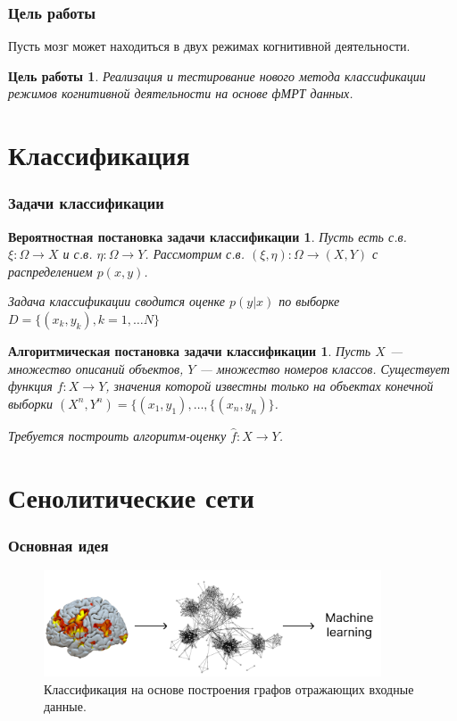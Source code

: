 \documentclass{beamer}
\newtheorem{target_}{Цель работы}
\newtheorem{prob_}{Вероятностная постановка задачи классификации}
\newtheorem{algo_}{Алгоритмическая постановка задачи классификации}
\begin{document}
	\begin{frame} 
		\frametitle{Цель работы}
		Пусть мозг может находиться в двух режимах когнитивной деятельности. 
		
		\begin{target_}
			Реализация и тестирование нового метода классификации режимов когнитивной деятельности на основе фМРТ данных.
		\end{target_}			
	\end{frame}

	\section{Классификация}
	\begin{frame} 
		\frametitle{Задачи классификации}
		\begin{prob_}
			Пусть есть с.в. $\xi: \Omega \rightarrow X$ и с.в. $\eta: \Omega \rightarrow Y$. Рассмотрим с.в. $(\xi, \eta): \Omega \rightarrow (X, Y)$ с распределением $p(x, y)$.
			\vspace{0.5cm}
			
			Задача классификации сводится оценке $p(y|x)$ по выборке $D = \{(x_{k}, y_{k}), k = 1, \dots N\}$
		\end{prob_}
	
		\begin{algo_}
			Пусть $X$ --- множество описаний объектов, $Y$ --- множество номеров классов. Существует функция $f: X \rightarrow Y$, значения которой известны только на объектах конечной выборки $(X^{n}, Y^{n}) = \{(x_{1}, y_{1}), \dots, \{(x_{n}, y_{n})\}$. 
			\vspace{0.5cm}
			
			Требуется построить алгоритм-оценку $\widehat{f}: X \rightarrow Y$.
		\end{algo_}
	\end{frame}
	
	\section{Сенолитические сети}
	\begin{frame} 
		\frametitle{Основная идея}
		\begin{figure}
			\includegraphics[width=10cm]{../images/fmri_graph_ml_1.pdf}
			\caption{Классификация на основе построения графов отражающих входные данные.} 
			\label{fg:3}
		\end{figure}
	\end{frame}
\end{document}
